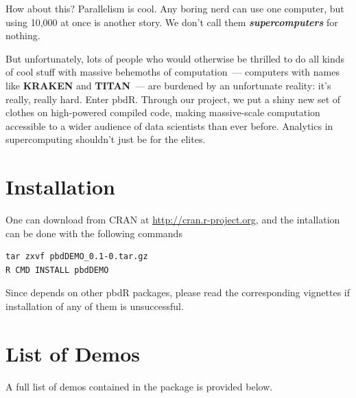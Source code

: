 How about this?  Parallelism is cool.  Any boring nerd can use one computer, but using 10,000 at once is another story.  We don't call them \emph{\textbf{supercomputers}} for nothing.

But unfortunately, lots of people who would otherwise be thrilled to do all kinds of cool stuff with massive behemoths of computation~--- computers with names like \textbf{KRAKEN} and \textbf{TITAN}~--- are burdened by an unfortunate reality:  it's really, really hard.  Enter pbdR.  Through our project, we put a shiny new set of clothes on high-powered compiled code, making massive-scale computation accessible to a wider audience of data scientists than ever before.  Analytics in supercomputing shouldn't just be for the elites.



\section[Installation]{Installation}
\label{sec:installation}

One can download  from CRAN at
\url{http://cran.r-project.org}, and
the intallation can be done with the following commands
\begin{lstlisting}
tar zxvf pbdDEMO_0.1-0.tar.gz
R CMD INSTALL pbdDEMO
\end{lstlisting}
Since  depends on other pbdR packages, please read the corresponding vignettes if installation of any of them is unsuccessful.


\section{List of Demos}
\label{sec:demolist}

A full list of demos contained in the  package is provided below.

